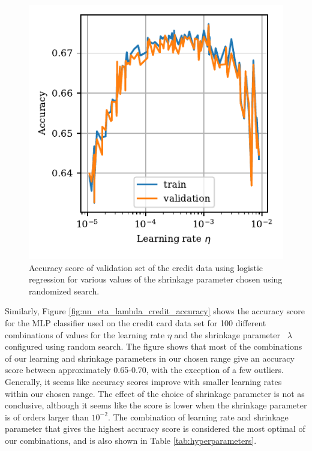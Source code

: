 \documentclass[a4paper, 11pt, twocolumn]{article}
\begin{document}
\begin{figure}[H]
	\includegraphics[scale=1]{figures/logreg_learning_rate_accuracy.pdf}
	\caption{Accuracy score of validation set of the credit data using  logistic
	regression for various values of the shrinkage parameter
	chosen using randomized search.}
	\label{fig:logreg_eta_accuracy}
\end{figure}

Similarly, Figure \ref{fig:nn_eta_lambda_credit_accuracy} shows the accuracy
score for the MLP classifier used on the credit card data set for 100 different
combinations of values for the learning rate $\eta$ and the shrinkage parameter 
$\lambda$ configured using random search. The figure shows that most of the
combinations of our learning and shrinkage parameters in our chosen range give
an accuracy score between approximately 0.65-0.70, with the exception of a few
outliers. Generally, it seems like accuracy scores improve with smaller learning
rates within our chosen range. The effect of the choice of shrinkage parameter
is not as conclusive, although it seems like the score is lower when the
shrinkage parameter is of orders larger than $10^{-2}$. The combination of
learning rate and shrinkage parameter that gives the highest accuracy score is
considered the most optimal of our combinations, and is also shown in Table
\ref{tab:hyperparameters}.
\end{document}
